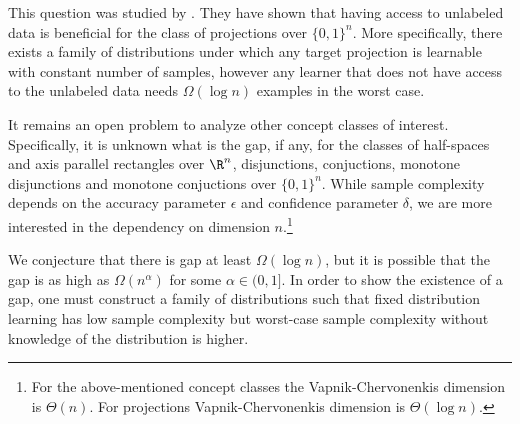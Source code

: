\documentclass[12pt]{colt2019}
\begin{document}
This question was studied by \cite{}. They have shown that having access to
unlabeled data is beneficial for the class of projections over $\{0,1\}^n$. More
specifically, there exists a family of distributions under which any target
projection is learnable with constant number of samples, however any learner
that does not have access to the unlabeled data needs $\Omega(\log n)$ examples
in the worst case.

It remains an open problem to analyze other concept classes of interest.
Specifically, it is unknown what is the gap, if any, for the classes of
half-spaces and axis parallel rectangles over $\R^n$, disjunctions, conjuctions,
monotone disjunctions and monotone conjuctions over $\{0,1\}^n$. While sample
complexity depends on the accuracy parameter $\epsilon$ and confidence parameter
$\delta$, we are more interested in the dependency on dimension
$n$.\footnote{For the above-mentioned concept classes the Vapnik-Chervonenkis
dimension is $\Theta(n)$. For projections Vapnik-Chervonenkis dimension is
$\Theta(\log n)$.}

We conjecture that there is gap at least $\Omega(\log n)$, but it is possible
that the gap is as high as $\Omega(n^\alpha)$ for some $\alpha \in (0,1]$. In
order to show the existence of a gap, one must construct a family of
distributions such that fixed distribution learning has low sample complexity
but worst-case sample complexity without knowledge of the distribution is
higher.
\end{document}
